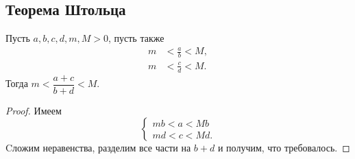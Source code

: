 \subsection{Теорема Штольца}

\begin{lemma} \hypertarget{t6_1}{}
	Пусть $a, b, c, d, m, M > 0$, пусть также
	\begin{align*}
		m &< \frac{a}{b} < M, \\
		m &< \frac{c}{d} < M.
	\end{align*}
	Тогда $m < \dfrac{a + c}{b + d} < M$.
\end{lemma}
\begin{proof}
	Имеем \[
	\begin{cases}
		mb < a < Mb \\
		md < c < Md.	
	\end{cases}
	\]
	Cложим неравенства, разделим все части на $b + d$ и получим, что требовалось.
\end{proof}

